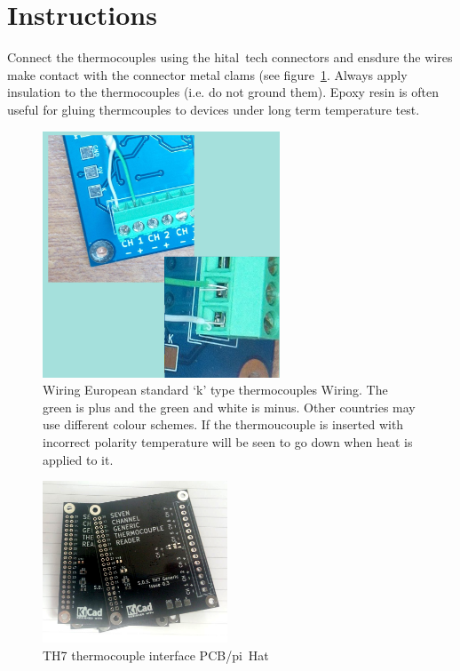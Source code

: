 \documentclass[a4paper,10pt]{article}
\begin{document}
\section{Instructions}

Connect the thermocouples using the hital~tech connectors and ensdure the wires make contact with the 
connector metal clams (see figure~\ref{fig:con}.
Always apply insulation to the thermocouples (i.e. do not ground them).
Epoxy resin is often useful for gluing thermcouples to devices under long term temperature test.

\begin{figure}[h]
 \centering
 \includegraphics[width=200pt]{./wiring.JPG}
 \caption{Wiring European standard `k' type thermocouples Wiring. The green is plus and the green and white is minus. Other countries may use different colour schemes. 
 If the thermoucouple is inserted with incorrect polarity temperature will be seen to go down when heat is applied to it.}
 \label{fig:con}
\end{figure}

\begin{figure}[h]
 \centering
 \includegraphics[width=156pt]{./TH7_0p3.jpg}
 \caption{TH7 thermocouple interface PCB/pi~Hat}
 \label{fig:th7}
\end{figure}
\end{document}
